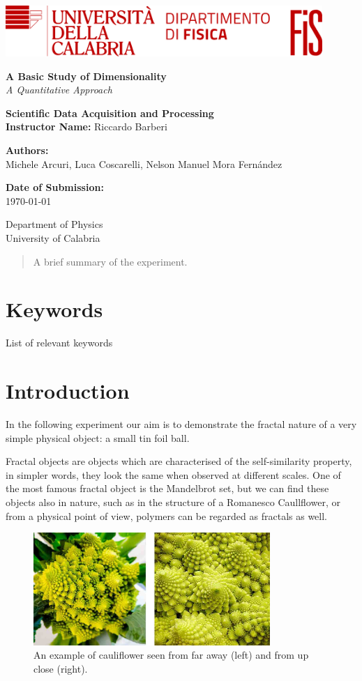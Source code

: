 \documentclass[a4paper,12pt]{article}
\newcommand{\customtitlepage}{
    

    \begin{titlepage}
        \includegraphics[width=0.9\textwidth]{logo.png}\\
        \centering
        \vspace*{1cm}
        
        \Huge\textbf{A Basic Study of Dimensionality}\\
        \vspace{0.5cm}
        \LARGE\textit{A Quantitative Approach}\\
        \vspace{1.5cm}
        
        \textbf{Scientific Data Acquisition and Processing} \\
        \textbf{Instructor Name:} Riccardo Barberi\\
        \vspace{0.5cm}
        
        \textbf{Authors:}\\
        \large Michele Arcuri, Luca Coscarelli, Nelson Manuel Mora Fernández\\
        \vfill
        
        \large \textbf{Date of Submission:}\\
        \today\\
        \vspace{1.5cm}
        
        \small
        Department of Physics \\
        University of Calabria\\
        \vspace{0.5cm}
    \end{titlepage}
}
\begin{document}
\customtitlepage

\begin{abstract}
    A brief summary of the experiment.
\end{abstract}


\section*{Keywords}
List of relevant keywords 

\newpage

\tableofcontents
\newpage

\section{Introduction}
\par In the following experiment our aim is to demonstrate the fractal nature 
of a very simple physical object: a small tin foil ball. 

\par Fractal objects are objects which are characterised of the self-similarity 
property, in simpler words, they look the same when observed at different scales.
One of the most famous fractal object is the Mandelbrot set, but we can find these 
objects also in nature, such as in the structure of a Romanesco Caullflower, or 
from a physical point of view, polymers can be regarded as fractals as well.

\begin{figure}[h]
    \centering
    \includegraphics[width = 0.8\textwidth]{Cauliflower.jpg}
    \caption{An example of cauliflower seen from far away (left) and from up close (right).}
    \label{fig:Cauliflower}
\end{figure}
\end{document}

